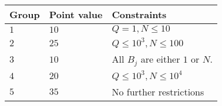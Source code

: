 \noindent
\begin{tabular}{| l | l | l |}
\hline
  Group & Point value & Constraints \\ \hline
  $1$    & $10$       &  $Q=1, N \leqslant 10$ \\ \hline            
  $2$    & $25$       &  $Q\leqslant 10^3, N \leqslant 100$\\ \hline    
  $3$    & $10$       &  All $B_j$ are either $1$ or $N$. \\ \hline
  $4$    & $20$       &  $Q\leqslant 10^3, N \leqslant 10^4$ \\ \hline   
  $5$    & $35$       &  No further restrictions \\ \hline        
\end{tabular}
